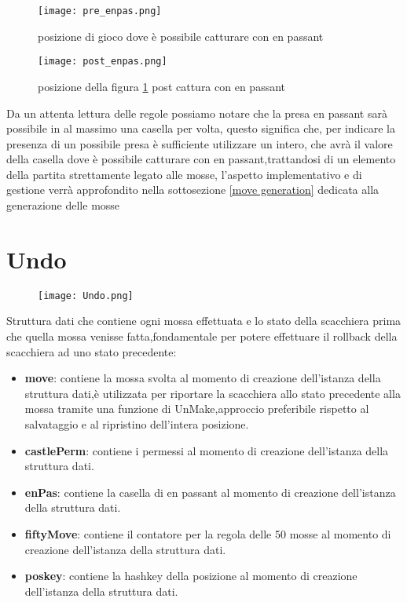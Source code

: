\begin{figure}[H]
    \centering
    \begin{minipage}[t]{0.4\textwidth}
        \texttt{[image: pre\_enpas.png]}
        \caption{posizione di gioco dove è possibile catturare con en passant}
        \label{pre_enpas}
    \end{minipage}
    \hfill
    \begin{minipage}[t]{0.4\textwidth}
        \texttt{[image: post\_enpas.png]}
        \caption{posizione della figura \ref{pre_enpas} post cattura con en passant}
    \end{minipage}
\end{figure}
Da un attenta lettura delle regole possiamo notare che la presa en passant sarà possibile in al massimo una casella per volta,
questo significa che, per indicare la presenza di un possibile presa è sufficiente utilizzare un intero, che avrà il valore della casella dove è
possibile catturare con en passant,trattandosi di un elemento della partita strettamente legato alle mosse, l'aspetto implementativo e di gestione verrà approfondito nella sottosezione \ref{move generation} dedicata alla generazione delle mosse


\section{Undo}
\label{undo}
\begin{figure}[H]
    \centering
    \texttt{[image: Undo.png]}
\end{figure}
Struttura dati che contiene ogni mossa effettuata e lo stato della scacchiera prima che quella mossa venisse fatta,fondamentale per potere effettuare
il rollback della scacchiera ad uno stato precedente:
\begin{itemize}
    \item   \textbf{move}: contiene la mossa svolta al momento di creazione dell'istanza della struttura dati,è utilizzata per riportare la scacchiera allo stato precedente alla mossa tramite una funzione di UnMake,approccio preferibile rispetto al salvataggio e al ripristino dell'intera posizione.
    \item   \textbf{castlePerm}: contiene i permessi al momento di creazione dell'istanza della struttura dati.
    \item   \textbf{enPas}: contiene la casella di en passant al momento di creazione dell'istanza della struttura dati.
    \item   \textbf{fiftyMove}: contiene il contatore per la regola delle 50 mosse al momento di creazione dell'istanza della struttura dati.
    \item   \textbf{poskey}: contiene la hashkey della posizione al momento di creazione dell'istanza della struttura dati.
\end{itemize}
